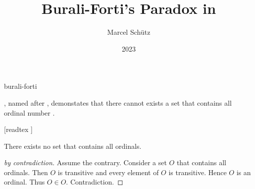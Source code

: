 \documentclass{stex}
\begin{document}
\title{Burali-Forti's Paradox in \Naproche}
\author{Marcel Schütz}
\date{2023}
\maketitle
\begin{smodule}{burali-forti}
\begin{sparagraph}
  \noindent \emph{}, named after , demonstates that there cannot exists a set that contains all ordinal number \cite{BuraliForti1897}.
\end{sparagraph}

\begin{forthel}
  [readtex ]

  \begin{theorem*}\label{burali_forti_paradox}
    There exists no set that contains all ordinals.
  \end{theorem*}
  \begin{proof}[ by contradiction]
    Assume the contrary.
    Consider a set $O$ that contains all ordinals.
    Then $O$ is transitive and every element of $O$ is transitive.
    Hence $O$ is an ordinal.
    Thus $O \in O$.
    Contradiction.
  \end{proof}
\end{forthel}
\end{smodule}
\printbibliography
\end{document}
